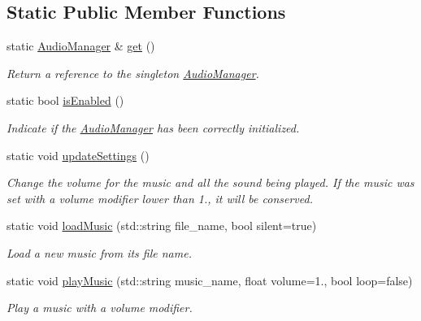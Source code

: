 \subsection*{Static Public Member Functions}
\begin{DoxyCompactItemize}
\item 
static \hyperlink{class_audio_manager}{Audio\+Manager} \& \hyperlink{class_audio_manager_ac8e8acadc8bba682bd3835997d379f5c}{get} ()
\begin{DoxyCompactList}\small\item\em Return a reference to the singleton \hyperlink{class_audio_manager}{Audio\+Manager}. \end{DoxyCompactList}\item 
static bool \hyperlink{class_audio_manager_a68184311194e3f5609e34b8e806655b9}{is\+Enabled} ()
\begin{DoxyCompactList}\small\item\em Indicate if the \hyperlink{class_audio_manager}{Audio\+Manager} has been correctly initialized. \end{DoxyCompactList}\item 
\mbox{\label{class_audio_manager_ad690966e6184debfb05c160d2bbda6a8}} 
static void \hyperlink{class_audio_manager_ad690966e6184debfb05c160d2bbda6a8}{update\+Settings} ()
\begin{DoxyCompactList}\small\item\em Change the volume for the music and all the sound being played. If the music was set with a volume modifier lower than 1., it will be conserved. \end{DoxyCompactList}\item 
static void \hyperlink{class_audio_manager_a3bb15b3e23faa7ddd6ccd39da27d8484}{load\+Music} (std\+::string file\+\_\+name, bool silent=true)
\begin{DoxyCompactList}\small\item\em Load a new music from its file name. \end{DoxyCompactList}\item 
static void \hyperlink{class_audio_manager_ae0f9ebfae17ee406df9f2fb3b7701a4c}{play\+Music} (std\+::string music\+\_\+name, float volume=1., bool loop=false)
\begin{DoxyCompactList}\small\item\em Play a music with a volume modifier. \end{DoxyCompactList}\item 

\end{DoxyCompactItemize}
